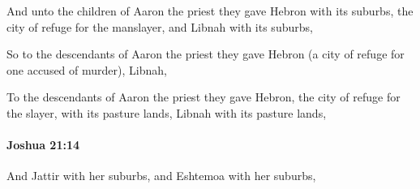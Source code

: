			\begin{versebox}
					\item[BHS] 
					\item[ASV] And unto the children of Aaron the priest they gave Hebron with its suburbs, the city of refuge for the manslayer, and Libnah with its suburbs,
					\item[NIV] So to the descendants of Aaron the priest they gave Hebron (a city of refuge for one accused of murder), Libnah,
					\item[NRSV] To the descendants of Aaron the priest they gave Hebron, the city of refuge for the slayer, with its pasture lands, Libnah with its pasture lands,
			\end{versebox}

		\paragraph{Joshua 21:14} %
			\label{JOSHUA-21-14}

			And Jattir with her suburbs, and Eshtemoa with her suburbs,

